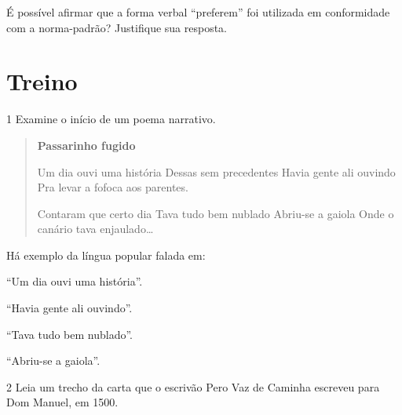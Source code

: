 É possível afirmar que a forma verbal ``preferem'' foi utilizada em conformidade com a norma-padrão? Justifique sua resposta.


\section{Treino}

\num{1} Examine o início de um poema narrativo.


\begin{quote}
\textbf{Passarinho fugido}

Um dia ouvi uma história Dessas sem precedentes Havia gente ali ouvindo
Pra levar a fofoca aos parentes.

Contaram que certo dia Tava tudo bem nublado Abriu-se a gaiola Onde o
canário tava enjaulado\ldots{}

\end{quote}

Há exemplo da língua popular falada em:

\begin{escolha}
\item ``Um dia ouvi uma história''.

\item ``Havia gente ali ouvindo''.

\item ``Tava tudo bem nublado''.

\item ``Abriu-se a gaiola''.

\end{escolha}

\num{2} Leia um trecho da carta que o escrivão Pero Vaz de Caminha escreveu para Dom Manuel, em 1500.

